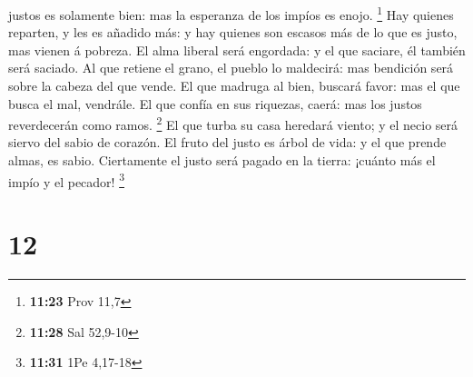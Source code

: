 justos es solamente bien: mas la esperanza de los impíos es enojo.
\footnote{\textbf{11:23} Prov 11,7}  Hay quienes
reparten, y les es añadido más: y hay quienes son escasos más de lo que
es justo, mas vienen á pobreza.  El alma liberal será
engordada: y el que saciare, él también será saciado.  Al
que retiene el grano, el pueblo lo maldecirá: mas bendición será sobre
la cabeza del que vende.  El que madruga al bien, buscará
favor: mas el que busca el mal, vendrále.  El que confía
en sus riquezas, caerá: mas los justos reverdecerán como ramos.
\footnote{\textbf{11:28} Sal 52,9-10}  El que turba su
casa heredará viento; y el necio será siervo del sabio de corazón.
 El fruto del justo es árbol de vida: y el que prende
almas, es sabio.  Ciertamente el justo será pagado en la
tierra: ¡cuánto más el impío y el pecador! \footnote{\textbf{11:31} 1Pe
  4,17-18}

\hypertarget{section-11}{%
\section{12}\label{section-11}}

